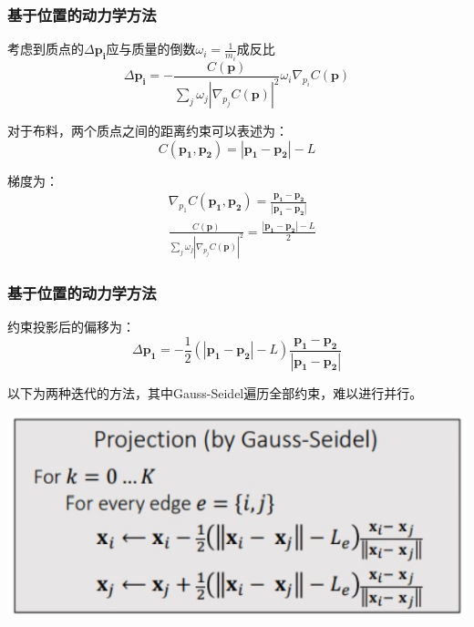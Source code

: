 \documentclass[aspectratio=43]{ctexbeamer}
\begin{document}
\begin{frame}
  \frametitle{基于位置的动力学方法}
		考虑到质点的$\Delta \pmb{p_i}$应与质量的倒数$\omega_i=\frac{1}{m_i}$成反比
        \begin{equation}
\Delta \pmb{p_i} = -\frac{C(\pmb{p})}{\sum_{j} \omega_j\left | \nabla_{p_j}C(\pmb{p}) \right | ^2}\omega_i\nabla_{p_i}C(\pmb{p})
        \end{equation}

		对于布料，两个质点之间的距离约束可以表述为：
        \begin{equation}
			C(\pmb{p_1},\pmb{p_2})=\left | \pmb{p_1}-\pmb{p_2} \right |-L
        \end{equation}

		梯度为：
		\begin{equation}
		\begin{split}
			&\nabla_{p_1}C(\pmb{p_1},\pmb{p_2})=\frac{\pmb{p_1}-\pmb{p_2}}{\left | \pmb{p_1}-\pmb{p_2} \right |}\\
			&\frac{C(\pmb{p})}{\sum_{j} \omega_j\left | \nabla_{p_j}C(\pmb{p}) \right | ^2} = \frac{\left | \pmb{p_1}-\pmb{p_2} \right |-L}{2}
		\end{split}
		\end{equation}
\end{frame}

\begin{frame}
  \frametitle{基于位置的动力学方法}
		约束投影后的偏移为：
        \begin{equation}
		\Delta \pmb{p_1} =-\frac{1}{2}(\left | \pmb{p_1}-\pmb{p_2} \right |-L)\frac{\pmb{p_1}-\pmb{p_2}}{\left | \pmb{p_1}-\pmb{p_2} \right |}
        \end{equation}

		以下为两种迭代的方法，其中Gauss-Seidel遍历全部约束，难以进行并行。
        \begin{center}
            \includegraphics[width=0.7\linewidth]{./fig/PBD(Gauss-Seidel).jpg}
        \end{center}
\end{frame}
\end{document}
